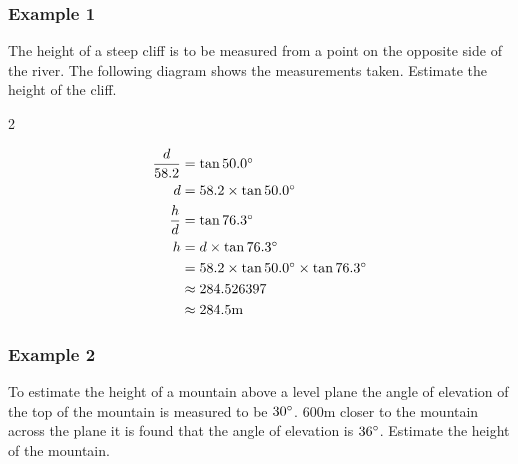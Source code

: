 \subsubsection{Example 1}
The height of a steep cliff is to be measured from a point on the opposite side of the river.  The
following diagram shows the measurements taken. Estimate the height of the cliff. 

\clearpage
\columnsep =30pt
\begin {multicols}{2}
 

   
\setlength\fboxrule{0in}\setlength\fboxsep{0.2in}



\begin{align*}\frac{d}{58.2} &  =  \tan  50.0 \mbox{{\ensuremath{{}^\circ}}} \\
d &  =  58.2 \times \tan  50.0 \mbox{{\ensuremath{{}^\circ}}} \\
\frac{h}{d} &  =  \tan  76.3 \mbox{{\ensuremath{{}^\circ}}} \\
h &  =  d \times \tan  76.3 \mbox{{\ensuremath{{}^\circ}}} \\
 &  =  58.2 \times \tan  50.0 \mbox{{\ensuremath{{}^\circ}}} \times \tan  76.3 \mbox{{\ensuremath{{}^\circ}}} \\
 &  \approx   284.526397 \\
 &  \approx   284.5 \mbox{m}\end{align*}


\end {multicols}


\subsubsection{Example 2}
To estimate the height of a mountain above a level plane the angle of elevation of the top of the mountain is measured to be $30 \mbox{{\ensuremath{{}^\circ}}}$. $600 \mbox{m}$ closer to the mountain across the plane it is found that the angle of elevation
is $36 \mbox{{\ensuremath{{}^\circ}}}$. Estimate the height of the mountain. 

   
\setlength\fboxrule{0in}\setlength\fboxsep{0.2in}



